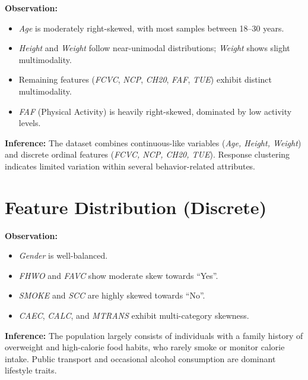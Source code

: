 \textbf{Observation:}
\begin{itemize}
    \item \textit{Age} is moderately right-skewed, with most samples between 18–30 years.
    \item \textit{Height} and \textit{Weight} follow near-unimodal distributions; \textit{Weight} shows slight multimodality.
    \item Remaining features (\textit{FCVC}, \textit{NCP}, \textit{CH20}, \textit{FAF}, \textit{TUE}) exhibit distinct multimodality.
    \item \textit{FAF} (Physical Activity) is heavily right-skewed, dominated by low activity levels.
\end{itemize}

\textbf{Inference:}
The dataset combines continuous-like variables (\textit{Age, Height, Weight}) and discrete ordinal features (\textit{FCVC, NCP, CH20, TUE}).
Response clustering indicates limited variation within several behavior-related attributes.



\section{Feature Distribution (Discrete)}\label{sec:feature-distribution-(discrete)}

\textbf{Observation:}
\begin{itemize}
    \item \textit{Gender} is well-balanced.
    \item \textit{FHWO} and \textit{FAVC} show moderate skew towards “Yes”.
    \item \textit{SMOKE} and \textit{SCC} are highly skewed towards “No”.
    \item \textit{CAEC}, \textit{CALC}, and \textit{MTRANS} exhibit multi-category skewness.
\end{itemize}

\textbf{Inference:}
The population largely consists of individuals with a family history of overweight and high-calorie food habits, who rarely smoke or monitor calorie intake.
Public transport and occasional alcohol consumption are dominant lifestyle traits.



